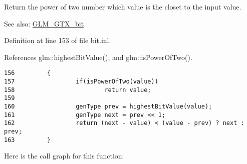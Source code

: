 Return the power of two number which value is the closet to the input value. \begin{Desc}
\item[See also:]\hyperlink{group__gtx__bit}{GLM\_\-GTX\_\-bit} \end{Desc}


Definition at line 153 of file bit.inl.

References glm::highestBitValue(), and glm::isPowerOfTwo().

\begin{Code}\begin{verbatim}156         {
157                 if(isPowerOfTwo(value))
158                         return value;
159 
160                 genType prev = highestBitValue(value);
161                 genType next = prev << 1;
162                 return (next - value) < (value - prev) ? next : prev;
163         }
\end{verbatim}
\end{Code}




Here is the call graph for this function:
